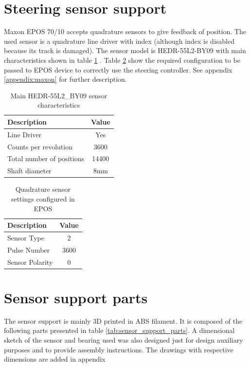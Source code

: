 \section{Steering sensor support}
Maxon EPOS 70/10 accepts quadrature sensors to give feedback of position. The used sensor is a quadrature line driver with index (although index is disabled because its track is damaged). The sensor model is HEDR-55L2-BY09 with main characteristics shown in table \ref{tab:quad_sensor} \cite{hedr_sensor}. Table \ref{tab:quad_sensor_settings} show the required configuration to be passed to EPOS device to correctly use the steering controller. See appendix \ref{appendix:maxon} for further description.
\begin{table}[!hb]
	\centering
	\begin{tabular}{lc}
		\toprule
		\textbf{Description} & \textbf{Value}\\
		\midrule
		Line Driver & Yes\\
		Counts per revolution & 3600\\
		Total number of positions & 14400\\
		Shaft diameter & 8mm\\
		\bottomrule
	\end{tabular}
	\caption{Main HEDR-55L2\_BY09 sensor characteristics}
	\label{tab:quad_sensor}
\end{table}

\begin{table}[!hb]
	\centering
	\begin{tabular}{lc}
		\toprule
		\textbf{Description} & \textbf{Value}\\
		\midrule
		Sensor Type & 2\\
		Pulse Number & 3600\\
		Sensor Polarity & 0\\
		\bottomrule
	\end{tabular}
	\caption{Quadrature sensor settings configured in EPOS}
	\label{tab:quad_sensor_settings}
\end{table}

\section{Sensor support parts}
The sensor support is mainly 3D printed in ABS filament. It is composed of the following parts presented in table \ref{tab:sensor_support_parts}.
A dimensional sketch of the sensor and bearing used was also designed just for design auxiliary purposes and to provide assembly instructions. The drawings with respective dimensions are added in appendix 

